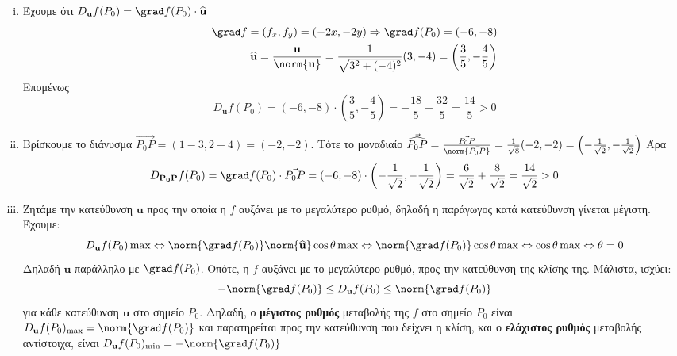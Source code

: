 \documentclass[a4paper,table]{report}
\begin{document}
  \begin{solution}
    \begin{enumerate}[i)]
      \item Έχουμε ότι $ D_{\mathbf{u}}f(P_{0}) = \grad f(P_{0}) \cdot 
        \mathbf{\widehat{u}} $
        \begin{align*}
          \grad f = (f_{x}, f_{y}) = (-2x, -2y) \Rightarrow \grad f(P_{0}) = (-6,-8) \\
          \mathbf{\widehat{u}} = \frac{\mathbf{u}}{\norm{\mathbf{u}}} =
          \frac{1}{\sqrt{3^{2}+(-4)^{2}}} (3,-4) = \left(\frac{3}{5} , - 
          \frac{4}{5}\right)
        \end{align*} 
        Επομένως
        \[
          D_{\mathbf{u}}f(P_{0}) = (-6,-8) \cdot \left(\frac{3}{5} , - \frac{4}{5}\right) 
          = - \frac{18}{5} + \frac{32}{5} = \frac{14}{5} > 0
        \] 
      \item Βρίσκουμε το διάνυσμα $ \vec{P_{0}P} = (1-3,2-4) = (-2,-2) $. Τότε το 
        μοναδιαίο $ \vec{\widehat{P_{0}P}} =
        \frac{\vec{P_{0}P}}{\norm{\vec{P_{0}P}}} = \frac{1}{\sqrt{8}} (-2,-2) = \left(-
        \frac{1}{\sqrt{2}} , - \frac{1}{\sqrt{2}}\right) $
        Άρα 
        \[
          D_{\mathbf{P_{0}P}}f(P_{0}) = \grad f(P_{0}) \cdot \vec{P_{0}P} = (-6,-8) 
          \cdot \left(- \frac{1}{\sqrt{2}} , - \frac{1}{\sqrt{2}}\right) = 
          \frac{6}{\sqrt{2}} + \frac{8}{\sqrt{2}} = \frac{14}{\sqrt{2}} > 0
        \] 
      \item Ζητάμε την κατεύθυνση $ \mathbf{u} $ προς την οποία η $f$ αυξάνει με το 
        μεγαλύτερο ρυθμό, δηλαδή η παράγωγος κατά κατεύθυνση γίνεται μέγιστη. Έχουμε:
        \[
          D_{\mathbf{u}}f(P_{0}) \max \Leftrightarrow \norm{\grad f (P_{0})}
          \norm{\mathbf{\widehat{u}}} \cos{\theta} \max \Leftrightarrow 
          \norm{\grad f(P_{0})} \cos{\theta} \max \Leftrightarrow \cos{\theta} \max
          \Leftrightarrow \theta = 0
        \]
        Δηλαδή $ \mathbf{u} $ παράλληλο με $ \grad f(P_{0}) $. Οπότε, η $f$ αυξάνει με 
        το μεγαλύτερο ρυθμό, προς την κατεύθυνση της κλίσης της. Μάλιστα, ισχύει:
        \[
          - \norm{\grad f(P_{0})} \leq D_{\mathbf{u}} f(P_{0}) \leq \norm{\grad f(P_{0})}
        \]
        για κάθε κατεύθυνση $ \mathbf{u} $ στο σημείο $ P_{0} $. 
        Δηλαδή, ο \textbf{μέγιστος ρυθμός} μεταβολής της $f$ στο σημείο $ P_{0} $ είναι $
        D_{\mathbf{u}}f(P_{0})_{\max} = \norm{\grad f(P_{0})} $ και παρατηρείται προς 
        την κατεύθυνση που δείχνει η κλίση, και ο \textbf{ελάχιστος ρυθμός} μεταβολής
        αντίστοιχα, είναι $ D_{\mathbf{u}}f(P_{0})_{\min} = -\norm{\grad f(P_{0})} $ 

\end{enumerate}
\end{solution}
\end{document}
